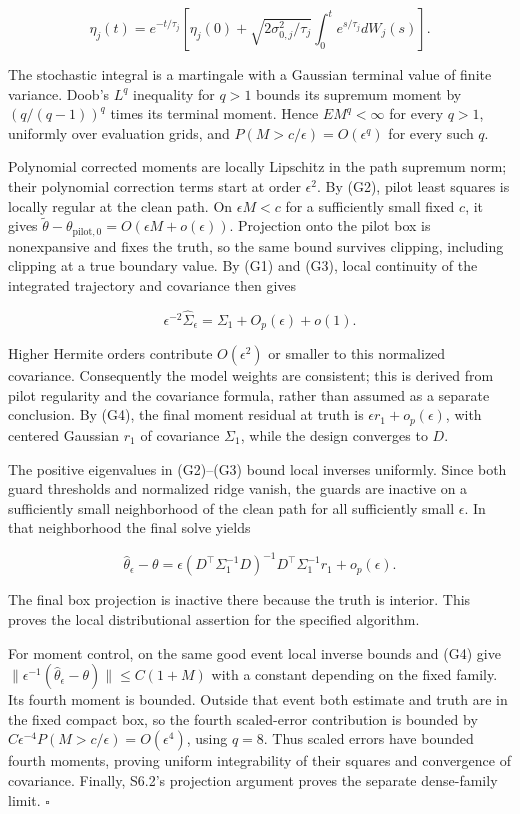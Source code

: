 \documentclass[
  american,
  11pt,
]{article}
\newcounter{none} %
\begin{document}
\[
\eta_j(t)=e^{-t/\tau_j}
\left[\eta_j(0)+\sqrt{2\sigma_{0,j}^2/\tau_j}
\int_0^t e^{s/\tau_j}dW_j(s)\right].
\]

The stochastic integral is a martingale with a Gaussian terminal value
of finite variance. Doob's \(L^q\) inequality for \(q>1\) bounds its
supremum moment by \((q/(q-1))^q\) times its terminal moment. Hence
\(E M^q<\infty\) for every \(q>1\), uniformly over evaluation grids, and
\(P(M>c/\epsilon)=O(\epsilon^q)\) for every such \(q\).

Polynomial corrected moments are locally Lipschitz in the path supremum
norm; their polynomial correction terms start at order \(\epsilon^2\).
By (G2), pilot least squares is locally regular at the clean path. On
\(\epsilon M<c\) for a sufficiently small fixed \(c\), it gives
\(\widetilde\theta-\theta_{\mathrm{pilot},0}=O(\epsilon M+o(\epsilon))\).
Projection onto the pilot box is nonexpansive and fixes the truth, so
the same bound survives clipping, including clipping at a true boundary
value. By (G1) and (G3), local continuity of the integrated trajectory
and covariance then gives

\[
\epsilon^{-2}\widehat\Sigma_\epsilon
=\Sigma_1+O_p(\epsilon)+o(1).
\]

Higher Hermite orders contribute \(O(\epsilon^2)\) or smaller to this
normalized covariance. Consequently the model weights are consistent;
this is derived from pilot regularity and the covariance formula, rather
than assumed as a separate conclusion. By (G4), the final moment
residual at truth is \(\epsilon r_1+o_p(\epsilon)\), with centered
Gaussian \(r_1\) of covariance \(\Sigma_1\), while the design converges
to \(D\).

The positive eigenvalues in (G2)--(G3) bound local inverses uniformly.
Since both guard thresholds and normalized ridge vanish, the guards are
inactive on a sufficiently small neighborhood of the clean path for all
sufficiently small \(\epsilon\). In that neighborhood the final solve
yields

\[
\widehat\theta_\epsilon-\theta
=\epsilon(D^\top\Sigma_1^{-1}D)^{-1}D^\top\Sigma_1^{-1}r_1
+o_p(\epsilon).
\]

The final box projection is inactive there because the truth is
interior. This proves the local distributional assertion for the
specified algorithm.

For moment control, on the same good event local inverse bounds and (G4)
give \(\|\epsilon^{-1}(\widehat\theta_\epsilon-\theta)\|
\leq C(1+M)\) with a constant depending on the fixed family. Its fourth
moment is bounded. Outside that event both estimate and truth are in the
fixed compact box, so the fourth scaled-error contribution is bounded by
\(C\epsilon^{-4}P(M>c/\epsilon)=O(\epsilon^4)\), using \(q=8\). Thus
scaled errors have bounded fourth moments, proving uniform integrability
of their squares and convergence of covariance. Finally, S6.2's
projection argument proves the separate dense-family limit. \(\square\)
\end{document}
